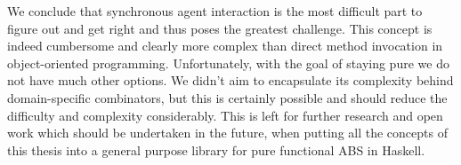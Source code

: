 We conclude that synchronous agent interaction is the most difficult part to figure out and get right and thus poses the greatest challenge. This concept is indeed cumbersome and clearly more complex than direct method invocation in object-oriented programming. Unfortunately, with the goal of staying pure we do not have much other options. We didn't aim to encapsulate its complexity behind domain-specific combinators, but this is certainly possible and should reduce the difficulty and complexity considerably. This is left for further research and open work which should be undertaken in the future, when putting all the concepts of this thesis into a general purpose library for pure functional ABS in Haskell.